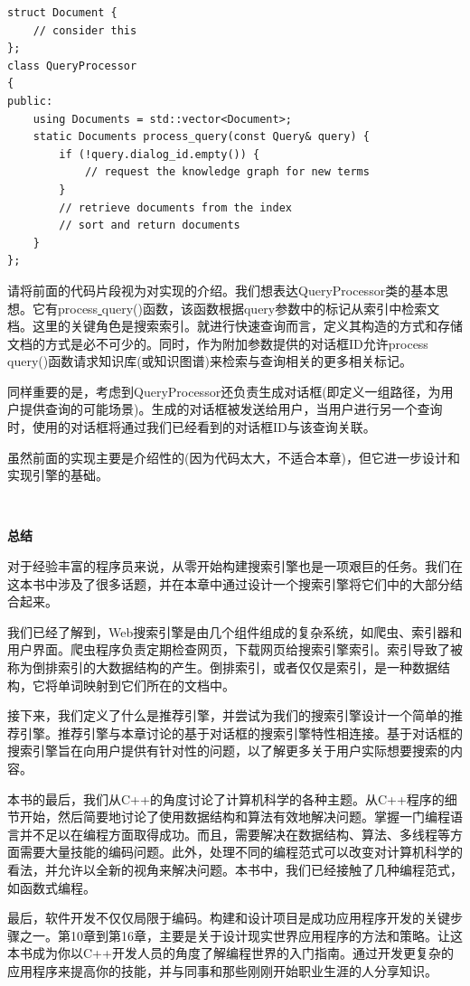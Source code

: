 \begin{lstlisting}[caption={}]
struct Document {
	// consider this
};
class QueryProcessor
{
public:
	using Documents = std::vector<Document>;
	static Documents process_query(const Query& query) {
		if (!query.dialog_id.empty()) {
			// request the knowledge graph for new terms
		}
		// retrieve documents from the index
		// sort and return documents
	}
};
\end{lstlisting}

请将前面的代码片段视为对实现的介绍。我们想表达QueryProcessor类的基本思想。它有process\underline{ }query()函数，该函数根据query参数中的标记从索引中检索文档。这里的关键角色是搜索索引。就进行快速查询而言，定义其构造的方式和存储文档的方式是必不可少的。同时，作为附加参数提供的对话框ID允许process\underline{ }query()函数请求知识库(或知识图谱)来检索与查询相关的更多相关标记。 \par
同样重要的是，考虑到QueryProcessor还负责生成对话框(即定义一组路径，为用户提供查询的可能场景)。生成的对话框被发送给用户，当用户进行另一个查询时，使用的对话框将通过我们已经看到的对话框ID与该查询关联。 \par
虽然前面的实现主要是介绍性的(因为代码太大，不适合本章)，但它进一步设计和实现引擎的基础。 \par

\noindent\textbf{}\ \par
\textbf{总结} \ \par
对于经验丰富的程序员来说，从零开始构建搜索引擎也是一项艰巨的任务。我们在这本书中涉及了很多话题，并在本章中通过设计一个搜索引擎将它们中的大部分结合起来。 \par
我们已经了解到，Web搜索引擎是由几个组件组成的复杂系统，如爬虫、索引器和用户界面。爬虫程序负责定期检查网页，下载网页给搜索引擎索引。索引导致了被称为倒排索引的大数据结构的产生。倒排索引，或者仅仅是索引，是一种数据结构，它将单词映射到它们所在的文档中。 \par
接下来，我们定义了什么是推荐引擎，并尝试为我们的搜索引擎设计一个简单的推荐引擎。推荐引擎与本章讨论的基于对话框的搜索引擎特性相连接。基于对话框的搜索引擎旨在向用户提供有针对性的问题，以了解更多关于用户实际想要搜索的内容。 \par
本书的最后，我们从C++的角度讨论了计算机科学的各种主题。从C++程序的细节开始，然后简要地讨论了使用数据结构和算法有效地解决问题。掌握一门编程语言并不足以在编程方面取得成功。而且，需要解决在数据结构、算法、多线程等方面需要大量技能的编码问题。此外，处理不同的编程范式可以改变对计算机科学的看法，并允许以全新的视角来解决问题。本书中，我们已经接触了几种编程范式，如函数式编程。 \par
最后，软件开发不仅仅局限于编码。构建和设计项目是成功应用程序开发的关键步骤之一。第10章到第16章，主要是关于设计现实世界应用程序的方法和策略。让这本书成为你以C++开发人员的角度了解编程世界的入门指南。通过开发更复杂的应用程序来提高你的技能，并与同事和那些刚刚开始职业生涯的人分享知识。 \par

